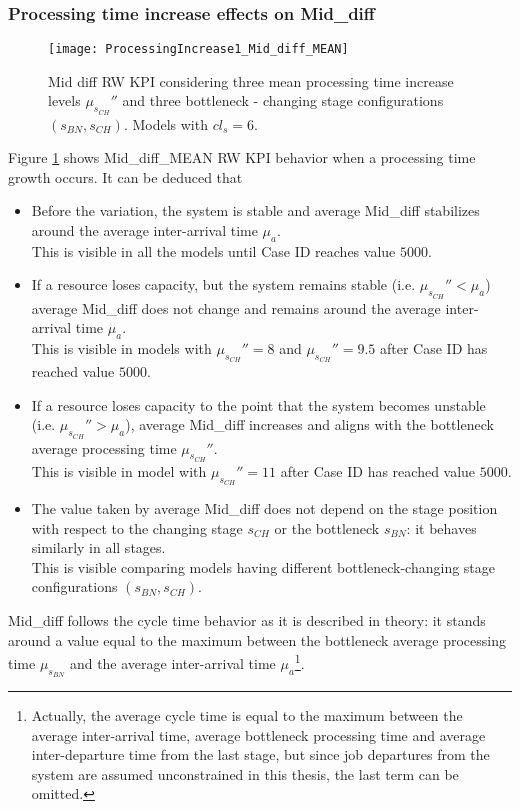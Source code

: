 \subsubsection{Processing time increase effects on Mid\_diff}
\begin{figure}[h] 
\centering
\texttt{[image: ProcessingIncrease1\_Mid\_diff\_MEAN]}
\caption[Mid diff RW KPI behavior considering different processing time increase levels]{Mid diff RW KPI considering three mean processing time increase levels $\mu_{s_{CH}}''$ and three bottleneck - changing stage configurations $(s_{BN},s_{CH})$. Models with $cl_s=6$.}
\label{fig:Mid diff RW KPI behavior with different processing time increase levels}
\end{figure}
Figure \ref{fig:Mid diff RW KPI behavior with different processing time increase levels} shows Mid\_diff\_MEAN RW KPI behavior when a processing time growth occurs. It can be deduced that
\begin{itemize}
\item Before the variation, the system is stable and average Mid\_diff stabilizes around the average inter-arrival time $\mu_a$. \\This is visible in all the models until Case ID reaches value $5000$.
\item If a resource loses capacity, but the system remains stable (i.e. $\mu_{s_{CH}}''<\mu_a$) average Mid\_diff does not change and remains around the average inter-arrival time $\mu_a$. \\This is visible in models with $\mu_{s_{CH}}''=8$ and $\mu_{s_{CH}}''=9.5$ after Case ID has reached value $5000$.
\item If a resource loses capacity to the point that the system becomes unstable (i.e. $\mu_{s_{CH}}''>\mu_a$), average Mid\_diff increases and aligns with the bottleneck average processing time $\mu_{s_{CH}}''$. \\This is visible in model with $\mu_{s_{CH}}''=11$ after Case ID has reached value $5000$.
\item The value taken by average Mid\_diff does not depend on the stage position with respect to the changing stage $s_{CH}$ or the bottleneck $s_{BN}$: it behaves similarly in all stages. \\This is visible comparing models having different bottleneck-changing stage configurations $(s_{BN},s_{CH})$.
\end{itemize}
Mid\_diff follows the cycle time behavior as it is described in theory: it stands around a value equal to the maximum between the bottleneck average processing time $\mu_{s_{BN}}$ and the average inter-arrival time $\mu_a$\footnote{Actually, the average cycle time is equal to the maximum between the average inter-arrival time, average bottleneck processing time and average inter-departure time from the last stage, but since job departures from the system are assumed unconstrained in this thesis, the last term can be omitted.}. 
